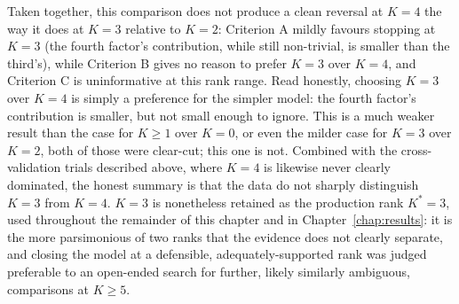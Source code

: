 Taken together, this comparison does not produce a clean reversal at $K=4$ the way it does at $K=3$ relative to $K=2$: Criterion A mildly favours stopping at $K=3$ (the fourth factor's contribution, while still non-trivial, is smaller than the third's), while Criterion B gives no reason to prefer $K=3$ over $K=4$, and Criterion C is uninformative at this rank range. Read honestly, choosing $K=3$ over $K=4$ is simply a preference for the simpler model: the fourth factor's contribution is smaller, but not small enough to ignore. This is a much weaker result than the case for $K\geq 1$ over $K=0$, or even the milder case for $K=3$ over $K=2$, both of those were clear-cut; this one is not. Combined with the cross-validation trials described above, where $K=4$ is likewise never clearly dominated, the honest summary is that the data do not sharply distinguish $K=3$ from $K=4$. $K=3$ is nonetheless retained as the production rank $K^*=3$, used throughout the remainder of this chapter and in Chapter~\ref{chap:results}: it is the more parsimonious of two ranks that the evidence does not clearly separate, and closing the model at a defensible, adequately-supported rank was judged preferable to an open-ended search for further, likely similarly ambiguous, comparisons at $K \geq 5$.

